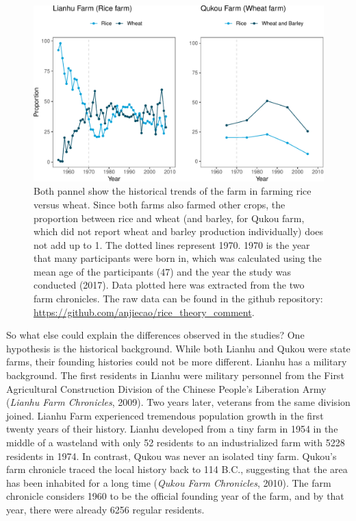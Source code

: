 \documentclass[
  man]{apa6}
\begin{document}
\begin{figure}
\centering
\includegraphics{comment_files/figure-latex/unnamed-chunk-2-1.pdf}
\caption{\label{fig:unnamed-chunk-2}Both pannel show the historical trends of the farm in farming rice versus wheat. Since both farms also farmed other crops, the proportion between rice and wheat (and barley, for Qukou farm, which did not report wheat and barley production individually) does not add up to 1. The dotted lines represent 1970. 1970 is the year that many participants were born in, which was calculated using the mean age of the participants (47) and the year the study was conducted (2017). Data plotted here was extracted from the two farm chronicles. The raw data can be found in the github repository: \url{https://github.com/anjiecao/rice_theory_comment}.}
\end{figure}

So what else could explain the differences observed in the studies? One hypothesis is the historical background. While both Lianhu and Qukou were state farms, their founding histories could not be more different. Lianhu has a military background. The first residents in Lianhu were military personnel from the First Agricultural Construction Division of the Chinese People's Liberation Army (\emph{Lianhu Farm Chronicles}, 2009). Two years later, veterans from the same division joined. Lianhu Farm experienced tremendous population growth in the first twenty years of their history. Lianhu developed from a tiny farm in 1954 in the middle of a wasteland with only 52 residents to an industrialized farm with 5228 residents in 1974. In contrast, Qukou was never an isolated tiny farm. Qukou's farm chronicle traced the local history back to 114 B.C., suggesting that the area has been inhabited for a long time (\emph{Qukou Farm Chronicles}, 2010). The farm chronicle considers 1960 to be the official founding year of the farm, and by that year, there were already 6256 regular residents.
\end{document}

